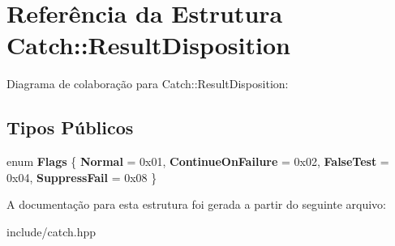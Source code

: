 \hypertarget{structCatch_1_1ResultDisposition}{}\section{Referência da Estrutura Catch\+:\+:Result\+Disposition}
\label{structCatch_1_1ResultDisposition}


Diagrama de colaboração para Catch\+:\+:Result\+Disposition\+:
\subsection*{Tipos Públicos}
\begin{DoxyCompactItemize}
\item 
enum {\bfseries Flags} \{ {\bfseries Normal} = 0x01, 
{\bfseries Continue\+On\+Failure} = 0x02, 
{\bfseries False\+Test} = 0x04, 
{\bfseries Suppress\+Fail} = 0x08
 \}\hypertarget{structCatch_1_1ResultDisposition_a3396cad6e2259af326b3aae93e23e9d8}{}\label{structCatch_1_1ResultDisposition_a3396cad6e2259af326b3aae93e23e9d8}

\end{DoxyCompactItemize}


A documentação para esta estrutura foi gerada a partir do seguinte arquivo\+:\begin{DoxyCompactItemize}
\item 
include/catch.\+hpp\end{DoxyCompactItemize}
